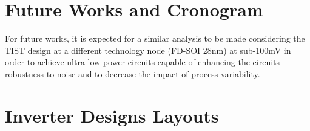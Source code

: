 \documentclass[pgmicro,mestrado,english]{iiufrgs}
\begin{document}
\begin{table}[]
\centering
\caption{Overall results considering the EDP and DPP for each metric and the product between those.}
\label{tab:edpddp}
\end{table}


\chapter{Future Works and Cronogram}

For future works, it is expected for a similar analysis to be made considering the TIST design at a different technology node (FD-SOI 28nm) at sub-100mV in order to achieve ultra low-power circuits capable of enhancing the circuits robustness to noise and to decrease the impact of process variability.


%
%
%




\annex
\chapter{Inverter Designs Layouts}
\end{document}
